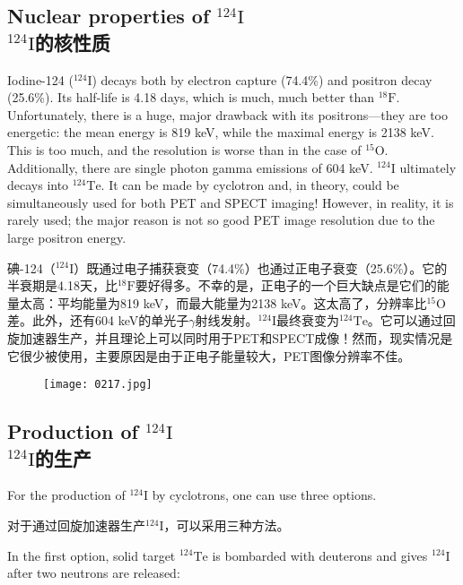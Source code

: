 \documentclass[dvipsnames, svgnames,a4paper,11pt]{article}
\begin{document}
\subsection{Nuclear properties of \(\mathrm{^{124}I}\)\\ \(\mathrm{^{124}I}\)的核性质}  
Iodine-124 (\(\mathrm{^{124}I}\)) decays both by electron capture (74.4\%) and positron decay (25.6\%). Its half-life is 4.18 days, which is much, much better than \(\mathrm{^{18}F}\). Unfortunately, there is a huge, major drawback with its positrons—they are too energetic: the mean energy is 819 keV, while the maximal energy is 2138 keV. This is too much, and the resolution is worse than in the case of \(\mathrm{^{15}O}\). Additionally, there are single photon gamma emissions of 604 keV. \(\mathrm{^{124}I}\) ultimately decays into \(\mathrm{^{124}Te}\). It can be made by cyclotron and, in theory, could be simultaneously used for both PET and SPECT imaging! However, in reality, it is rarely used; the major reason is not so good PET image resolution due to the large positron energy.

碘-124（\(\mathrm{^{124}I}\)）既通过电子捕获衰变（74.4\%）也通过正电子衰变（25.6\%）。它的半衰期是4.18天，比\(\mathrm{^{18}F}\)要好得多。不幸的是，正电子的一个巨大缺点是它们的能量太高：平均能量为819 keV，而最大能量为2138 keV。这太高了，分辨率比\(\mathrm{^{15}O}\)差。此外，还有604 keV的单光子$\gamma$射线发射。\(\mathrm{^{124}I}\)最终衰变为\(\mathrm{^{124}Te}\)。它可以通过回旋加速器生产，并且理论上可以同时用于PET和SPECT成像！然而，现实情况是它很少被使用，主要原因是由于正电子能量较大，PET图像分辨率不佳。

\begin{figure}[h]
	\centering
    \texttt{[image: 0217.jpg]}  
     \label{fig271}
\end{figure}


\subsection{Production of \(\mathrm{^{124}I}\)\\ \(\mathrm{^{124}I}\)的生产}  
For the production of \(\mathrm{^{124}I}\) by cyclotrons, one can use three options.  

对于通过回旋加速器生产\(\mathrm{^{124}I}\)，可以采用三种方法。  

In the first option, solid target \(\mathrm{^{124}Te}\) is bombarded with deuterons and gives \(\mathrm{^{124}I}\) after two neutrons are released:  
\end{document}
